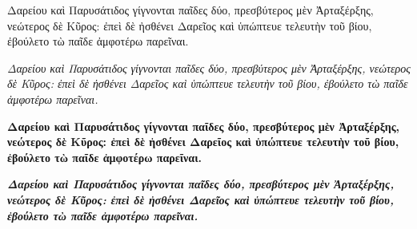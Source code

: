 \documentclass{article}
\begin{document}
\def\anabasis{
Δαρείου καὶ Παρυσάτιδος γίγνονται παῖδες δύο,
πρεσβύτερος μὲν Ἀρταξέρξης, νεώτερος δὲ Κῦρος:
ἐπεὶ δὲ ἠσθένει Δαρεῖος καὶ ὑπώπτευε τελευτὴν τοῦ βίου,
ἐβούλετο τὼ παῖδε ἀμφοτέρω παρεῖναι. }

\anabasis

\textit{\anabasis}

\textbf{\anabasis}

\textbf{\textit{\anabasis}}
\end{document}
